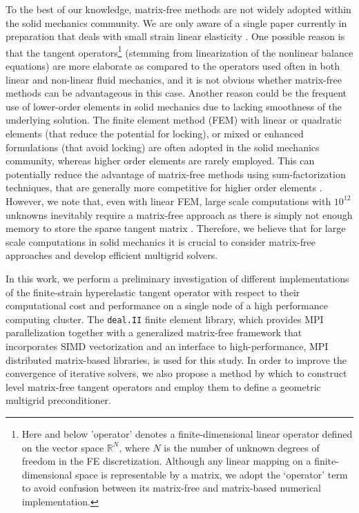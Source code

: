 \documentclass[times,doublespace]{nmeauth}
\begin{document}
To the best of our knowledge, matrix-free methods are not widely adopted within the solid mechanics community.
We are only aware of a single paper currently in preparation that deals with small strain linear elasticity \cite{Clevenger2018}.
One possible reason is that the tangent operators\footnote{Here and
below 'operator' denotes a finite-dimensional linear operator defined on the vector space $\mathbb R^N$, where $N$ is the number of unknown degrees of freedom in the FE discretization.
Although any linear mapping on a finite-dimensional space is representable by a matrix, we adopt the `operator' term to avoid confusion between its matrix-free and matrix-based numerical implementation.
} (stemming from linearization of the nonlinear balance equations) are
more elaborate as compared to the operators used often in both linear and non-linear fluid mechanics, and it is not obvious whether matrix-free methods can be advantageous in this case.
Another reason could be the frequent use of lower-order elements in solid mechanics due to lacking smoothness of the underlying solution.
The finite element method (FEM) with linear or quadratic elements (that reduce the potential for locking), or mixed or enhanced formulations (that avoid locking) are often adopted in the solid mechanics community,
whereas higher order elements are rarely employed.
This can potentially reduce the advantage of matrix-free methods using sum-factorization techniques, that are generally more competitive for higher order elements \cite{kronbichler12,kronbichler2017fast,muthing2017high}.
However, we note that, even with linear FEM, large scale computations with $10^{12}$ unknowns inevitably require a matrix-free approach as there is simply not enough memory to store the sparse tangent matrix \cite{Gmeiner2016}. Therefore, we believe that for large scale computations in solid mechanics it is crucial to consider matrix-free approaches and develop efficient multigrid solvers.

In this work, we perform a preliminary investigation of different implementations of the finite-strain hyperelastic tangent operator with respect to their computational cost
and performance on a single node of a high performance computing cluster.
The \texttt{deal.II} \cite{dealII90} finite element library, which provides MPI parallelization together with a generalized matrix-free framework that incorporates SIMD vectorization and an interface to high-performance, MPI distributed matrix-based libraries, is used for this study.
In order to improve the convergence of iterative solvers, we also propose a method by which to construct level matrix-free tangent operators
and employ them to define a \mbox{geometric} multigrid preconditioner.
\end{document}

